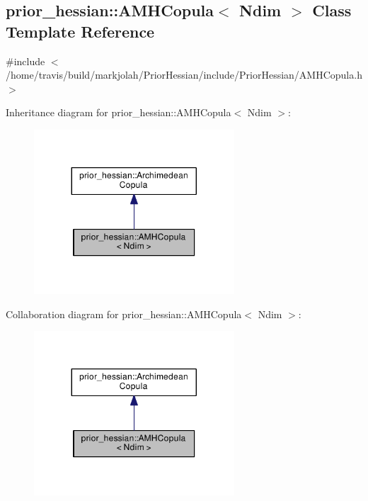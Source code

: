 \hypertarget{classprior__hessian_1_1AMHCopula}{}\subsection{prior\+\_\+hessian\+:\+:A\+M\+H\+Copula$<$ Ndim $>$ Class Template Reference}
\label{classprior__hessian_1_1AMHCopula}


{\ttfamily \#include $<$/home/travis/build/markjolah/\+Prior\+Hessian/include/\+Prior\+Hessian/\+A\+M\+H\+Copula.\+h$>$}



Inheritance diagram for prior\+\_\+hessian\+:\+:A\+M\+H\+Copula$<$ Ndim $>$\+:\nopagebreak
\begin{figure}[H]
\begin{center}
\leavevmode
\includegraphics[width=212pt]{classprior__hessian_1_1AMHCopula__inherit__graph}
\end{center}
\end{figure}


Collaboration diagram for prior\+\_\+hessian\+:\+:A\+M\+H\+Copula$<$ Ndim $>$\+:\nopagebreak
\begin{figure}[H]
\begin{center}
\leavevmode
\includegraphics[width=212pt]{classprior__hessian_1_1AMHCopula__coll__graph}
\end{center}
\end{figure}
